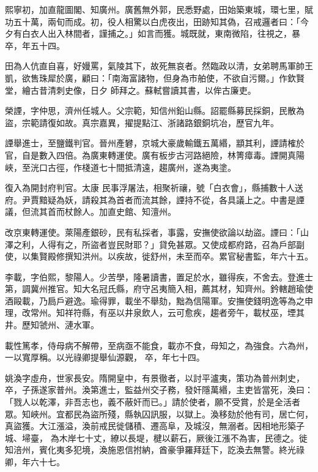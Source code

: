 \begin{pinyinscope}
 熙寧初，加直龍圖閣、知廣州。廣舊無外郭，民悉野處，田始築東城，環七里，賦功五十萬，兩旬而成。初，役人相驚以白虎夜出，田跡知其偽，召戒邏者曰：「今夕有白衣人出入林間者，謹捕之。」如言而獲。城既就，東南微陷，往視之，暴卒，年五十四。



 田為人伉直自喜，好嫚罵，氣陵其下，故死無哀者。然臨政以清，女弟聘馬軍帥王凱，欲售珠犀於廣，顧曰：「南海富諸物，但身為市舶使，不欲自污爾。」作欽賢堂，繪古昔清刺史像，日夕
 師拜之。蘇軾嘗讀其書，以侔古廉吏。



 榮諲，字仲思，濟州任城人。父宗範，知信州鉛山縣。詔罷縣募民採銅，民散為盜，宗範請復如故。真宗嘉異，擢提點江、浙諸路銀銅坑冶，歷官九年。



 諲舉進士，至鹽鐵判官。晉州產礬，京城大豪歲輸鐵五萬緡，顓其利，諲請榷於官，自是數入四倍。為廣東轉運使。廣有板步古河路絕險，林箐瘴毒。諲開真陽峽，至洸口古徑，作棧道七十間抵清遠，趨廣州，遂為夷塗。



 復入為開封府判官。太康
 民事浮屠法，相聚祈禳，號「白衣會」，縣捕數十人送府。尹賈黯疑為妖，請殺其為首者而流其餘，諲持不從，各具議上之。中書是諲議，但流其首而杖餘人。加直史館、知澶州。



 改京東轉運使。萊陽產銀砂，民有私採者，事露，安撫使欲論以劫盜。諲曰：「山澤之利，人得有之，所盜者豈民財耶？」貸免甚眾。又使成都府路，召為戶部副使，以集賢殿修撰知洪州。以疾故，徙舒州，未至而卒。累官秘書監，年六十五。



 李載，字伯熙，黎陽人。少苦學，隆暑讀書，置足於水，雖得疾，不舍去。登進士第，調冀州推官。知大名冠氏縣，府守呂夷簡入相，薦其材，知齊州。鈐轄趙瑜使酒毆載，乃扃戶避逸。瑜得罪，載坐不舉劾，黜為信陽軍。安撫使錢明逸等為之申理，改常州。知祥符縣，有巫以井泉飲人，云可愈疾，趨者旁午，載杖巫，堙其井。歷知虢州、漣水軍。



 載性篤孝，侍母病不解帶，至病亟不能食，載亦不食，母知之，為強食。六為州，一以寬厚稱。以光祿卿提舉仙源觀，
 卒，年七十四。



 姚渙字虛舟，世家長安。隋開皇中，有景徹者，以討平瀘夷，策功為普州刺史，卒，子孫遂家普州。渙第進士，監益州交子務，發奸隱萬緡，主吏皆當死，渙曰：「戮人以乾澤，非吾志也，義不蔽奸而已。」請於使者，願不受賞，於是全活者眾。知峽州。宜都民為盜所殘，縣執囚訊服，以獄上。渙移劾於他有司，居亡何，真盜獲。大江漲溢，渙前戒民徙儲積、遷高阜，及城沒，無溺者。因相地形築子城、埽臺，
 為木岸七十丈，繚以長堤，楗以薪石，厥後江漲不為害，民德之。徙知涪州，賓化夷多犯境，渙施恩信拊納，酋豪爭羅拜廷下，訖渙去無警。終光祿卿，年六十七。




\end{pinyinscope}

